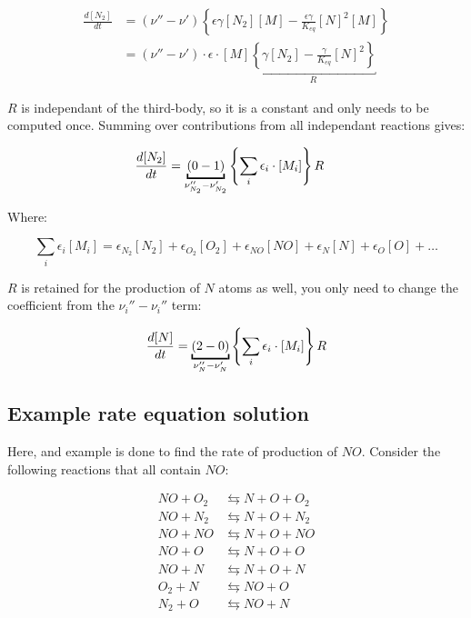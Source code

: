 \documentclass[10pt]{article}
\begin{document}
\begin{flushleft}
\begin{align*}
    \frac{d[N_2]}{dt} &= (\nu'' - \nu') \left\{ \epsilon \gamma [N_2][M] - \frac{\epsilon \gamma}{K_{eq}}[N]^2[M] \right\} 
    \\ &= (\nu'' - \nu') \cdot \epsilon \cdot [M] \underbracket{ \left\{ \gamma [N_2] - \frac{\gamma}{K_{eq}}[N]^2 \right\}}_{R}
\end{align*}

$R$ is independant of the third-body, so it is a constant and only needs to be computed once. Summing over contributions from all independant reactions gives:

\begin{align*}
    \frac{d[N_2]}{dt} &= \underbracket{(0 - 1)}_{\nu_{N_2}'' - \nu_{N_2}'} \bcb{\sum_{i} \epsilon_i \cdot [M_i]} R
\end{align*}

Where:

\begin{equation}
    \sum_i \epsilon_i [M_i] = \epsilon_{N_2} [N_2] + \epsilon_{O_2} [O_2] + \epsilon_{NO} [NO] + \epsilon_{N} [N] + \epsilon_{O} [O] + \dots
\end{equation}

$R$ is retained for the production of $N$ atoms as well, you only need to change the coefficient from the $\nu_i'' - \nu_i''$ term:

\begin{align*}
    \frac{d[N]}{dt} = \ub{(2 - 0)}{\nu_{N}'' - \nu_N'} \bcb{\sum_i \epsilon_i \cdot [M_i]} R
\end{align*}



\subsection{Example rate equation solution}

    Here, and example is done to find the rate of production of $NO$. Consider the following reactions that all contain $NO$:

    \begin{subequations}
        \begin{align}
            NO + O_2 &\leftrightarrows N + O + O_2
            \\ NO + N_2 &\leftrightarrows N + O + N_2
            \\ NO + NO &\leftrightarrows N + O + NO
            \\ NO + O &\leftrightarrows N + O + O
            \\ NO + N &\leftrightarrows N + O + N
            \\ O_2 + N &\leftrightarrows NO + O
            \\ N_2 + O &\leftrightarrows NO + N
        \end{align}
    \end{subequations}


\end{flushleft}
\end{document}
